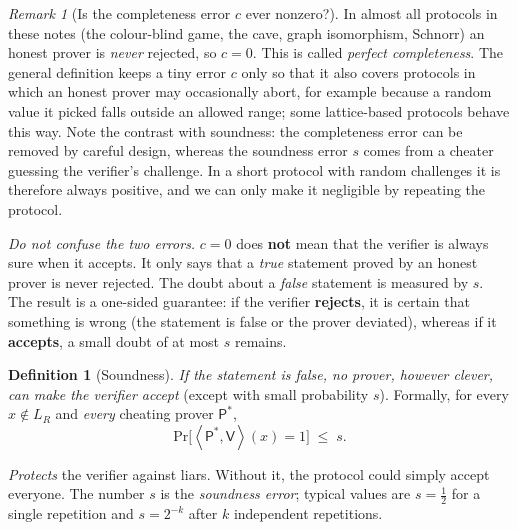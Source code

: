 \documentclass[11pt,a4paper]{report}
\theoremstyle{plain}
\theoremstyle{definition}
\newtheorem{definition}[theorem]{Definition}
\theoremstyle{remark}
\newtheorem{remark}[theorem]{Remark}
\renewcommand{\Pr}{\mathrm{Pr}}
\newcommand{\Prv}{\mathsf{P}}\newcommand{\Ver}{\mathsf{V}}
\newcommand{\pair}[2]{\left\langle #1,#2\right\rangle}
\begin{document}
\begin{remark}[Is the completeness error $c$ ever nonzero?]
In almost all protocols in these notes (the colour-blind game, the cave, graph isomorphism, Schnorr) an honest prover is \emph{never} rejected, so $c=0$. This is called \emph{perfect completeness}. The general definition keeps a tiny error $c$ only so that it also covers protocols in which an honest prover may occasionally abort, for example because a random value it picked falls outside an allowed range; some lattice-based protocols behave this way.
Note the contrast with soundness: the completeness error can be removed by careful design, whereas the soundness error $s$ comes from a cheater guessing the verifier's challenge. In a short protocol with random challenges it is therefore always positive, and we can only make it negligible by repeating the protocol.

\emph{Do not confuse the two errors.} $c=0$ does \textbf{not} mean that the verifier is always sure when it accepts. It only says that a \emph{true} statement proved by an honest prover is never rejected. The doubt about a \emph{false} statement is measured by $s$. The result is a one-sided guarantee: if the verifier \textbf{rejects}, it is certain that something is wrong (the statement is false or the prover deviated), whereas if it \textbf{accepts}, a small doubt of at most $s$ remains.
\end{remark}

\begin{definition}[Soundness]\label{def:intro-sound}
\emph{If the statement is false, no prover, however clever, can make the verifier accept} (except with small probability $s$). Formally, for every $x\notin L_R$ and \emph{every} cheating prover $\Prv^*$,
\[
 \Pr\big[\pair{\Prv^*}{\Ver}(x)=1\big]\;\le\;s.
\]
\end{definition}
\emph{Protects} the verifier against liars. Without it, the protocol could simply accept everyone. The number $s$ is the \emph{soundness error}; typical values are $s=\tfrac12$ for a single repetition and $s=2^{-k}$ after $k$ independent repetitions.
\end{document}
